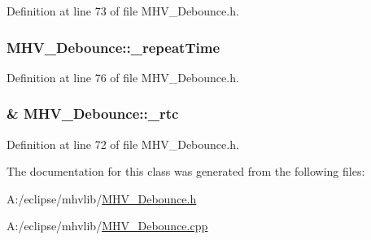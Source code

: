 \-Definition at line 73 of file \-M\-H\-V\-\_\-\-Debounce.\-h.

\hypertarget{class_m_h_v___debounce_a422167777e3bfcf6b7b46b992058950f}{
\subsubsection[{\-\_\-repeat\-Time}]{ {\bf \-M\-H\-V\-\_\-\-Debounce\-::\-\_\-repeat\-Time}}}
\label{class_m_h_v___debounce_a422167777e3bfcf6b7b46b992058950f}


\-Definition at line 76 of file \-M\-H\-V\-\_\-\-Debounce.\-h.

\hypertarget{class_m_h_v___debounce_a5594f588099ccfcff2b3b23b503e8f6d}{
\subsubsection[{\-\_\-rtc}]{\& {\bf \-M\-H\-V\-\_\-\-Debounce\-::\-\_\-rtc}}}
\label{class_m_h_v___debounce_a5594f588099ccfcff2b3b23b503e8f6d}


\-Definition at line 72 of file \-M\-H\-V\-\_\-\-Debounce.\-h.



\-The documentation for this class was generated from the following files\-:\begin{DoxyCompactItemize}
\item 
\-A\-:/eclipse/mhvlib/\hyperlink{_m_h_v___debounce_8h}{\-M\-H\-V\-\_\-\-Debounce.\-h}\item 
\-A\-:/eclipse/mhvlib/\hyperlink{_m_h_v___debounce_8cpp}{\-M\-H\-V\-\_\-\-Debounce.\-cpp}\end{DoxyCompactItemize}

